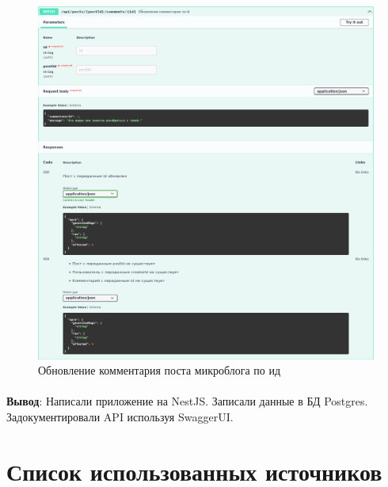 \documentclass[12pt, a4paper, simple]{eskdtext}
\begin{document}
  \begin{figure}[p!h]
    \centering
    \includegraphics[width=14cm]
    {images/SwaggerUi/2023-02-25_18-15-22.png}
    \caption{Обновление комментария поста микроблога по ид}
    \label{fig:more_11}
  \end{figure}

  \newpage

  \paragraph{} \textbf{Вывод}:
  Написали приложение на NestJS. Записали данные в БД Postgres. Задокументировали API используя SwaggerUI. 

  \newpage
  \begingroup
    \section*{Список использованных источников} %
\end{document}
